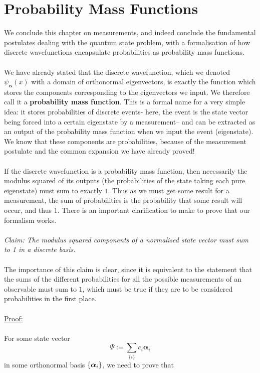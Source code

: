 \section{Probability Mass Functions}
We conclude this chapter on measurements, and indeed conclude the fundamental postulates dealing with the quantum state problem, with a formalisation of how discrete wavefunctions encapsulate probabilities as probability mass functions.
\\\\
We have already stated that the discrete wavefunction, which we denoted ${\psi}_{\bm{\alpha}}(x)$ with a domain of orthonormal eigenvectors, is exactly the function which stores the components corresponding to the eigenvectors we input. We therefore call it a \textbf{probability mass function}. This is a formal name for a very simple idea: it stores probabilities of discrete events- here, the event is the state vector being forced into a certain eigenstate by a measurement-- and can be extracted as an output of the probability mass function when we input the event (eigenstate). We know that these components are probabilities, because of the measurement postulate and the common expansion we have already proved! 
\\\\
If the discrete wavefunction is a probability mass function, then necessarily the modulus squared of its outputs (the probabilities of the state taking each pure eigenstate) must sum to exactly $1$. Thus as we must get some result for a measurement, the sum of probabilities is the probability that some result will occur, and thus 1. There is an important clarification to make to prove that our formalism works.
\\\\
\textit{Claim: The modulus squared components of a normalised state vector must sum to 1 in a discrete basis.}
\\\\
The importance of this claim is clear, since it is equivalent to the statement that the sums of the different probabilities for all the possible measurements of an observable must sum to $1$, which must be true if they are to be considered probabilities in the first place.
\\\\
\underline{Proof:}
\\\\
For some state vector
$$
\Psi:=\sum_{\{i\}}c_{i}\bm{\alpha}_{i}
$$ 
in some orthonormal basis $\{\bm{\alpha}_{i}\}$, we need to prove that 
